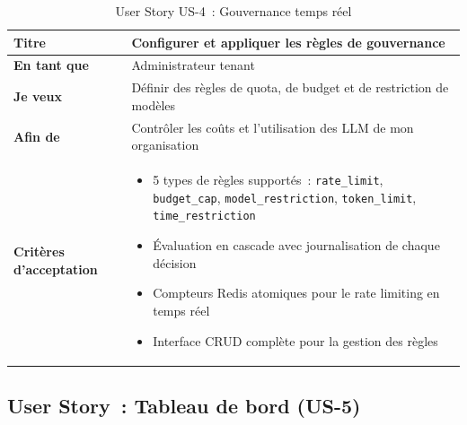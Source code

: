 \begin{table}[H]
\centering
\caption{User Story US-4~: Gouvernance temps réel}
\label{tab:us4}
\begin{tabularx}{\textwidth}{|l|X|}
\hline
\textbf{Titre} & Configurer et appliquer les règles de gouvernance \\
\hline
\textbf{En tant que} & Administrateur tenant \\
\hline
\textbf{Je veux} & Définir des règles de quota, de budget et de restriction de modèles \\
\hline
\textbf{Afin de} & Contrôler les coûts et l'utilisation des LLM de mon organisation \\
\hline
\textbf{Critères d'acceptation} & \begin{minipage}[t]{\linewidth}\vspace{2pt}
\begin{itemize}[noitemsep,topsep=0pt]
\item 5 types de règles supportés~: \texttt{rate\_limit}, \texttt{budget\_cap}, \texttt{model\_restriction}, \texttt{token\_limit}, \texttt{time\_restriction}
\item Évaluation en cascade avec journalisation de chaque décision
\item Compteurs Redis atomiques pour le rate limiting en temps réel
\item Interface CRUD complète pour la gestion des règles
\end{itemize}\vspace{2pt}
\end{minipage} \\
\hline
\end{tabularx}
\end{table}


\subsection{User Story~: Tableau de bord (US-5)}

